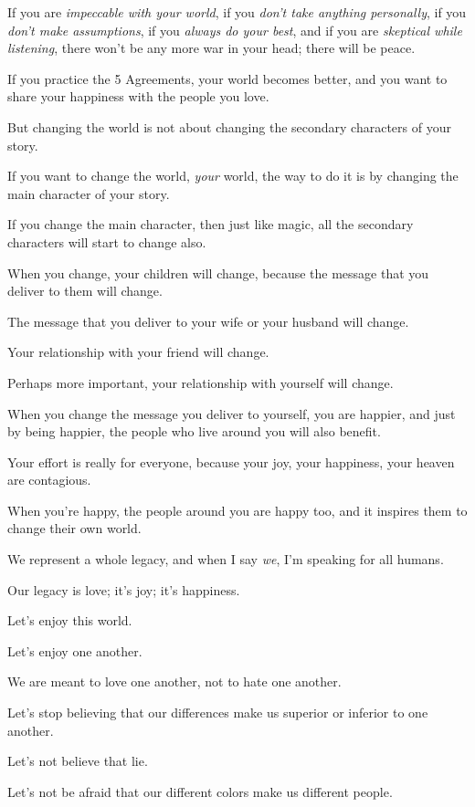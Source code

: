 \documentclass{article}
\numberwithin{equation}{section}
\begin{document}
If you are \textit{impeccable with your world}, if you \textit{don't take anything personally}, if you \textit{don't make assumptions}, if you \textit{always do your best}, and if you are \textit{skeptical while listening}, there won't be any more war in your head; there will be peace.

%
If you practice the 5 Agreements, your world becomes better, and you want to share your happiness with the people you love.

But changing the world is not about changing the secondary characters of your story.

If you want to change the world, \textit{your} world, the way to do it is by changing the main character of your story.

If you change the main character, then just like magic, all the secondary characters will start to change also.

When you change, your children will change, because the message that you deliver to them will change.

The message that you deliver to your wife or your husband will change.

Your relationship with your friend will change.

Perhaps more important, your relationship with yourself will change.

%
When you change the message you deliver to yourself, you are happier, and just by being happier, the people who live around you will also benefit.

Your effort is really for everyone, because your joy, your happiness, your heaven are contagious.

When you're happy, the people around you are happy too, and it inspires them to change their own world.

%
We represent a whole legacy, and when I say \textit{we}, I'm speaking for all humans.

Our legacy is love; it's joy; it's happiness.

Let's enjoy this world.

Let's enjoy one another.

We are meant to love one another, not to hate one another.

Let's stop believing that our differences make us superior or inferior to one another.

Let's not believe that lie.

Let's not be afraid that our different colors make us different people.
\end{document}
